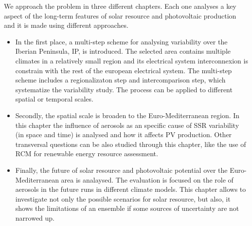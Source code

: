 We approach the problem in three different chapters. Each one analyses a key aspect of the long-term features of solar resource and photovoltaic production and it is made using different approaches.

\begin{itemize}
\item In the first place, a multi-step scheme for analysing variability over the Iberian Peninsula, IP, is introduced. The selected area contains multiple climates in a relatively small region and its electrical system interconnexion is constrain with the rest of the european electrical system. The multi-step scheme includes a regionalizaton step and intercomparison step, which systematize the variability study. The process can be applied to different spatial or temporal scales.

\item Secondly, the spatial scale is broaden to the Euro-Mediterranean region. In this chapter the influence of aerosols as an specific cause of SSR variability (in space and time) is analysed and how it affects PV production. Other transversal questions can be also studied through this chapter, like the use of RCM for renewable energy resource assessment.

\item Finally, the future of solar resource and photovoltaic potential over the Euro-Mediterranean area is analaysed. The evaluation is focused on the role of aerosols in the future runs in different climate models. This chapter allows to investigate not only the possible scenarios for solar resource, but also, it shows the limitations of an ensemble if some sources of uncertainty are not narrowed up.

\end{itemize}  




